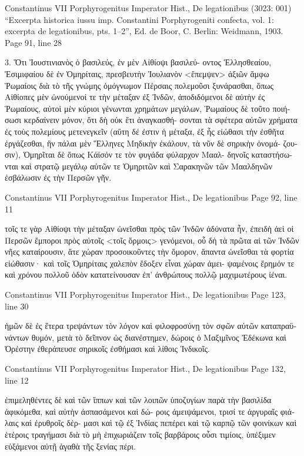 \documentclass[12pt,letterpaper,twoside,final]{memoir}
\begin{document}
\begin{greek}

Constantinus VII Porphyrogenitus Imperator Hist., De legationibus (3023: 001)
“Excerpta historica iussu imp. Constantini Porphyrogeniti confecta, vol. 1: excerpta de legationibus, pts. 1–2”, Ed. de Boor, C.
Berlin: Weidmann, 1903.
Page 91, line 28

3. Ὅτι Ἰουστινιανὸς ὁ βασιλεύς, ἐν μὲν Αἰθίοψι βασιλεύ-
οντος Ἑλλησθεαίου, Ἐσιμιφαίου δὲ ἐν Ὁμηρίταις, πρεσβευτὴν 
Ἰουλιανὸν <ἔπεμψεν> ἀξιῶν ἄμφω Ῥωμαίοις διὰ τὸ τῆς γνώμης 
ὁμόγνωμον Πέρσαις πολεμοῦσι ξυνάρασθαι, ὅπως Αἰθίοπες μὲν 
ὠνούμενοί τε τὴν μέταξαν ἐξ Ἰνδῶν, ἀποδιδόμενοι δὲ αὐτὴν ἐς 
Ῥωμαίους, αὐτοὶ μὲν κύριοι γένωνται χρημάτων μεγάλων, Ῥωμαίους 
δὲ τοῦτο ποιήσωσι κερδαίνειν μόνον, ὅτι δὴ οὐκ ἔτι ἀναγκασθή-
σονται τὰ σφέτερα αὐτῶν χρήματα ἐς τοὺς πολεμίους μετενεγκεῖν   
(αὕτη δέ ἐστιν ἡ μέταξα, ἐξ ἧς εἰώθασι τὴν ἐσθῆτα ἐργάζεσθαι, 
ἣν πάλαι μὲν Ἕλληνες Μηδικὴν ἐκάλουν, τὰ νῦν δὲ σηρικὴν ὀνομά-
ζουσιν), Ὁμηρῖται δὲ ὅπως Κάϊσόν τε τὸν φυγάδα φύλαρχον Μααλ-
δηνοῖς καταστήσωνται καὶ στρατῷ μεγάλῳ αὐτῶν τε Ὁμηριτῶν 
καὶ Σαρακηνῶν τῶν Μααλδηνῶν ἐσβάλωσιν ἐς τὴν Περσῶν γῆν. 



Constantinus VII Porphyrogenitus Imperator Hist., De legationibus 
Page 92, line 11

τοῖς τε γὰρ Αἰθίοψι τὴν μέταξαν ὠνεῖσθαι πρὸς τῶν Ἰνδῶν 
ἀδύνατα ἦν, ἐπειδὴ ἀεὶ οἱ Περσῶν ἔμποροι πρὸς αὐτοῖς <τοῖς 
ὅρμοις> γενόμενοι, οὗ δὴ τὰ πρῶτα αἱ τῶν Ἰνδῶν νῆες καταίρουσιν, 
ἅτε χώραν προσοικοῦντες τὴν ὅμορον, ἅπαντα ὠνεῖσθαι τὰ φορτία 
εἰώθασιν· καὶ τοῖς Ὁμηρίταις χαλεπὸν ἔδοξεν εἶναι χώραν ἀμει-
ψαμένοις ἔρημόν τε καὶ χρόνου πολλοῦ ὁδὸν κατατείνουσαν ἐπ' 
ἀνθρώπους πολλῷ μαχιμωτέρους ἰέναι. 



Constantinus VII Porphyrogenitus Imperator Hist., De legationibus 
Page 123, line 30

                                  ἡμῶν δὲ ἐς ἕτερα τρεψάντων τὸν 
λόγον καὶ φιλοφροσύνῃ τὸν σφῶν αὐτῶν καταπραϋνάντων θυμόν, 
μετὰ τὸ δεῖπνον ὡς διανέστημεν, δώροις ὁ Μαξιμῖνος Ἐδέκωνα 
καὶ Ὀρέστην ἐθεράπευσε σηρικοῖς ἐσθήμασι καὶ λίθοις Ἰνδικοῖς. 



Constantinus VII Porphyrogenitus Imperator Hist., De legationibus 
Page 132, line 12

      ἐπιμεληθέντες δὲ καὶ τῶν ἵππων καὶ τῶν λοιπῶν ὑποζυγίων 
παρὰ τὴν βασιλίδα ἀφικόμεθα, καὶ αὐτὴν ἀσπασάμενοι καὶ δώ-
ροις ἀμειψάμενοι, τρισί τε ἀργυραῖς φιάλαις καὶ ἐρυθροῖς δέρ-
μασι καὶ τῷ ἐξ Ἰνδίας πεπέρει καὶ τῷ καρπῷ τῶν φοινίκων καὶ 
ἑτέροις τραγήμασι διὰ τὸ μὴ ἐπιχωριάζειν τοῖς βαρβάροις οὖσι 
τιμίοις, ὑπέξιμεν εὐξάμενοι αὐτῇ ἀγαθὰ τῆς ξενίας πέρι. 




\end{greek}
\end{document}
